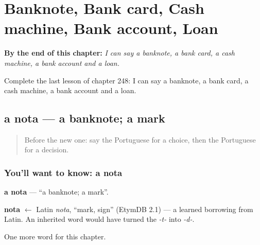 
\chapter{Banknote, Bank card, Cash machine, Bank account, Loan}
\label{ch:pt-banknote-bank-card-cash-machine-bank-account-loan}

\begin{chapteropening}
\textbf{By the end of this chapter:} \emph{I can say a banknote, a bank card, a cash machine, a bank account and a loan.}

Complete the last lesson of chapter 248: I can say a banknote, a bank card, a cash machine, a bank account and a loan.
\end{chapteropening}

\section[a nota]{a nota — a banknote; a mark}

\label{lesson:PT-C248-nota}



\begin{quote}
Before the new one: say the Portuguese for a choice, then the Portuguese for a decision.
\end{quote}

\subsection*{You'll want to know: a nota}
\textbf{a nota} — \textquotedblleft{}a banknote; a mark\textquotedblright{}.

\begin{cousinweb}
\textbf{nota} $\leftarrow$ Latin \emph{nota}, \textquotedblleft{}mark, sign\textquotedblright{} (EtymDB 2.1) — a learned borrowing from Latin. An inherited word would have turned the \emph{-t-} into \emph{-d-}.
\end{cousinweb}

\begin{grammarlens}[title={What you've built}]
One more word for this chapter.
\end{grammarlens}

